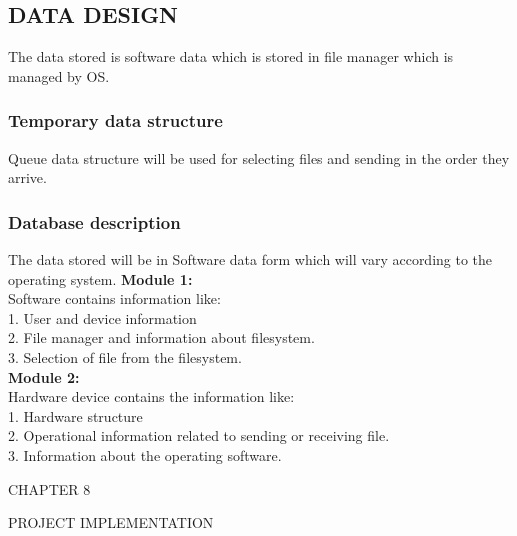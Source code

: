 \documentclass[12pt,a4paper]
{article}
\numberwithin{table}{section}
\begin{document}
{{{{{{{ 


\subsection{DATA DESIGN} 
The data stored is software data which is stored in file manager which is managed by OS. 

\subsubsection{Temporary data structure}
Queue data structure will be used for selecting files and sending in the order they arrive.
  
\subsubsection{Database description}
The data stored will be in Software data form which will vary according to the operating system.
\textbf{Module 1:} \\
	Software contains information like: \\
1.	User and device information\\
2.	File manager and information about filesystem.\\
3.	Selection of file from the filesystem. \\
\textbf{Module 2:}\\
	Hardware device contains the information like:\\
1.	Hardware structure\\
2.	Operational information related to sending or receiving file. \\
3.	Information about the operating software.\\ 








\newpage

\begin{minipage}{15cm}


\vspace{4 in}
 \begin{center} 
\begin{Huge}
CHAPTER 8

\vspace{0.5 in}

PROJECT IMPLEMENTATION
\end{Huge}


\end{center}
\end{minipage}}}}}}}}
\end{document}
